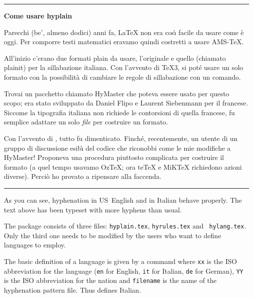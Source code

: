 \IT

\bigskip

\hrule

\medskip

\centerline{\bf Come usare hyplain}

\medskip

Parecchi (be', almeno dodici) anni fa, \LaTeX{} non era cos\`{\i} facile da usare come \`e
oggi. Per comporre testi matematici eravamo quindi costretti a usare AMS-\TeX{}.

All'inizio c'erano due formati plain da usare, l'originale e quello (chiamato plainit) per
la sillabazione italiana. Con l'avvento di \TeX3, si pot\'e usare un solo formato con la
possibilit\`a di cambiare le regole di sillabazione con un comando.

Trovai un pacchetto chiamato HyMaster che poteva essere usato per questo scopo; era stato
sviluppato da Daniel Flipo e Laurent Siebenmann per il francese. Siccome la tipografia
italiana non richiede le contorsioni di quella francese, fu semplice adattare un solo {\it
file\/} per costruire un formato.

Con l'avvento di \LaTeXe, tutto fu dimenticato. Finch\'e, recentemente, un utente di un
gruppo di discussione esib\`{\i} del codice che riconobbi come le mie modifiche a HyMaster!
Proponeva una procedura piuttosto complicata per costruire il formato (a quel tempo usavamo
Oz\TeX; ora te\TeX{} e MiK\TeX{} richiedono azioni diverse). Perci\`o ho provato a ripensare
alla faccenda.

\medskip

\hrule

\bigskip

\endgroup

\US

As you can see, hyphenation in US~English and in Italian behave properly. The text above has
been typeset with more hyphens than usual.

\medskip

The package consists of three files: {\tt hyplain.tex}, {\tt hyrules.tex} and {\tt
hylang.tex}. Only the third one needs to be modified by the users who want to define
languages to employ.

The basic definition of a language is given by a command
 where {\tt xx} is the ISO
abbreviation for the language ({\tt en} for English, {\tt it} for Italian, {\tt de} for
German), {\tt YY} is the ISO abbreviation for the nation and {\tt filename} is the name of
the hyphenation pattern file.  Thus
 defines Italian.

